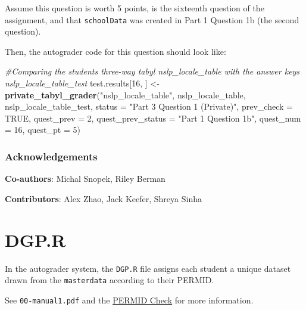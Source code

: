 \documentclass[
  12pt,
]{book}
\newenvironment{Shaded}{\begin{snugshade}}{\end{snugshade}}
\newcommand{\AttributeTok}[1]{\textcolor[rgb]{0.13,0.29,0.53}{#1}}
\newcommand{\CommentTok}[1]{\textcolor[rgb]{0.56,0.35,0.01}{\textit{#1}}}
\newcommand{\ConstantTok}[1]{\textcolor[rgb]{0.56,0.35,0.01}{#1}}
\newcommand{\DecValTok}[1]{\textcolor[rgb]{0.00,0.00,0.81}{#1}}
\newcommand{\FunctionTok}[1]{\textcolor[rgb]{0.13,0.29,0.53}{\textbf{#1}}}
\newcommand{\NormalTok}[1]{#1}
\newcommand{\OtherTok}[1]{\textcolor[rgb]{0.56,0.35,0.01}{#1}}
\newcommand{\StringTok}[1]{\textcolor[rgb]{0.31,0.60,0.02}{#1}}
\begin{document}
Assume this question is worth 5 points, is the sixteenth question of the assignment, and that \texttt{schoolData} was created in Part 1 Question 1b (the second question).

Then, the autograder code for this question should look like:

\begin{Shaded}
\begin{Highlighting}[]
\CommentTok{\#Comparing the student\textquotesingle{}s three{-}way tabyl \textasciigrave{}nslp\_locale\_table\textasciigrave{} with the answer key\textquotesingle{}s \textasciigrave{}nslp\_locale\_table\_test\textasciigrave{} }
\NormalTok{test.results[}\DecValTok{16}\NormalTok{, ] }\OtherTok{\textless{}{-}} \FunctionTok{private\_tabyl\_grader}\NormalTok{(}\StringTok{"nslp\_locale\_table"}\NormalTok{, nslp\_locale\_table, nslp\_locale\_table\_test, }
                                           \AttributeTok{status =} \StringTok{"Part 3 Question 1 (Private)"}\NormalTok{, }\AttributeTok{prev\_check =} \ConstantTok{TRUE}\NormalTok{, }
                                           \AttributeTok{quest\_prev =} \DecValTok{2}\NormalTok{, }\AttributeTok{quest\_prev\_status =} \StringTok{"Part 1 Question 1b"}\NormalTok{, }
                                           \AttributeTok{quest\_num =} \DecValTok{16}\NormalTok{, }\AttributeTok{quest\_pt =} \DecValTok{5}\NormalTok{)}
\end{Highlighting}
\end{Shaded}

\subsection*{Acknowledgements}\label{acknowledgements-2}

\textbf{Co-authors}: Michal Snopek, Riley Berman

\textbf{Contributors}: Alex Zhao, Jack Keefer, Shreya Sinha

\chapter{DGP.R}\label{DGP.R}

In the autograder system, the \texttt{DGP.R} file assigns each student a unique dataset drawn from the \texttt{masterdata} according to their PERMID.

See \texttt{00-manual1.pdf} and the \hyperref[PERMID-Check]{PERMID Check} for more information.
\end{document}
